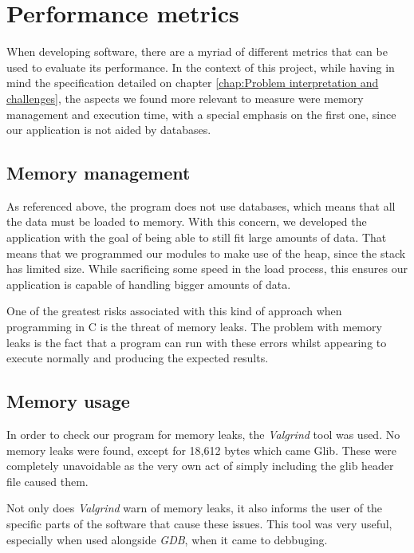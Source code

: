\documentclass[a4paper]{report}
\begin{document}
\chapter{Performance metrics}

When developing software, there are a myriad of different metrics that can be used to evaluate its performance. In the context of this project, while having in mind the specification detailed on chapter \ref{chap:Problem interpretation and challenges}, the aspects we found more relevant to measure were memory management and execution time, with a special emphasis on the first one, since our application is not aided by databases.



\section{Memory management}

As referenced above, the program does not use databases, which means that all the data must be loaded to memory. With this concern, we developed the application with the goal of being able to still fit large amounts of data. That means that we programmed our modules to make use of the heap, since the stack has limited size. While sacrificing some speed in the load process, this ensures our application is capable of handling bigger amounts of data.


One of the greatest risks associated with this kind of approach when programming in C is the threat of memory leaks.
The problem with memory leaks is the fact that a program can run with these errors whilst appearing to execute normally and producing the expected results.



\section{Memory usage}

In order to check our program for memory leaks, the \textit{Valgrind} tool was used. No memory leaks were found, except for 18,612 bytes which came Glib. These were completely unavoidable as the very own act of simply including the glib header file caused them.

Not only does \textit{Valgrind}  warn of memory leaks, it also informs the user of the specific parts of the software that cause these issues.
This tool was very useful, especially when used alongside \textit{GDB}, when it came to debbuging.
\end{document}
